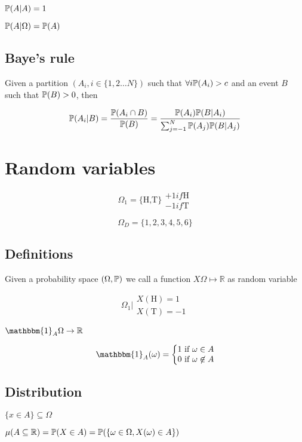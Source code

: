 $\mathbb{P}(A|A)=1$

$\mathbb{P}(A|\Omega)=\mathbb{P}(A)$

\subsection{Baye's rule}

Given a partition $(A_i,i\in\{1,2\dots N\})$ such that $\forall i \mathbb{P}(A_i)>c$ and an event $B$ such that $\mathbb{P}(B)>0$, then

$$
\mathbb{P}(A_i|B)=\frac{\mathbb{P}(A_i\cap B)}{\mathbb{P}(B)}=\frac{\mathbb{P}(A_i)\mathbb{P}(B|A_i)}{\sum_{j=-1}^N\mathbb{P}(A_j)\mathbb{P}(B|A_j)}
$$

\section{Random variables}

$$
\Omega_1=\{\text{H,T}\}
\begin{matrix}
+1 if \text{H}
\\
-1 if \text{T}
\end{matrix}
$$

$$
\Omega_D=\{ 1,2,3,4,5,6 \}
$$

\subsection{Definitions}

Given a probability space $(\Omega,\mathbb{P})$ we call a function $X \Omega\mapsto \mathbb{R}$ as random variable

$$
\Omega_1 \bigg|
\begin{matrix}
X(\text{H})=1
\\
X(\text{T})=-1
\end{matrix}
$$

$
\mathbbm{1}_A\Omega\rightarrow \mathbb{R}
$

$$
\mathbbm{1}_A(\omega)=\bigg\{
\begin{matrix}
1 \text{ if }\omega \in A
\\
0 \text{ if }\omega \not\in A
\end{matrix}
$$

\subsection{Distribution}

$\{x \in A\}\subseteq \Omega$

$\mu(A\subseteq\mathbb{R})=\mathbb{P}(X\in A)=\mathbb{P}(\{ \omega\in\Omega,  X(\omega)\in A \})$

